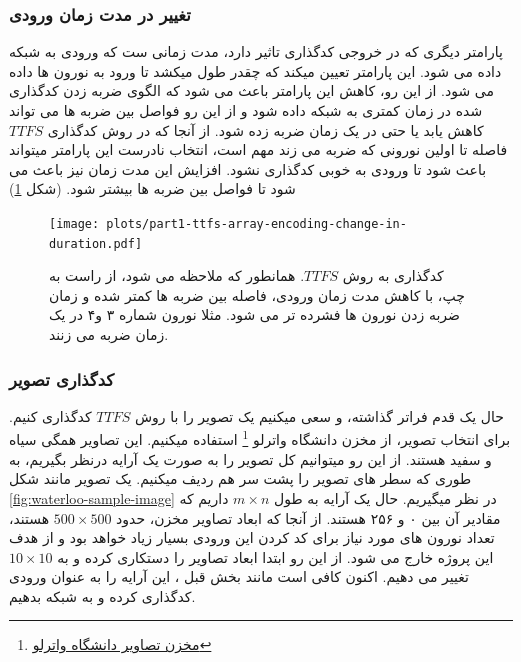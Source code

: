         \subsubsection*{تغییر در مدت زمان ورودی}
            پارامتر دیگری که در خروجی کدگذاری تاثیر دارد، مدت زمانی ست که ورودی به شبکه داده می شود. این پارامتر تعیین میکند که چقدر طول میکشد تا ورود به نورون ها داده می شود. از این رو، کاهش این پارامتر باعث می شود که الگوی ضربه زدن کدگذاری شده در زمان کمتری به شبکه داده شود و از این رو فواصل بین ضربه ها می تواند کاهش یابد یا حتی در یک زمان ضربه زده شود. از آنجا که در روش کدگذاری 
            $TTFS$ 
            فاصله تا اولین نورونی که ضربه می زند مهم است، انتخاب نادرست این پارامتر میتواند باعث شود تا ورودی به خوبی کدگذاری نشود.
            افزایش این مدت زمان نیز باعث می شود تا فواصل بین ضربه ها بیشتر شود.
            (شکل \ref{fig:part1-ttfs-array-encoding-change-in-duration})

            \begin{figure}[!ht]
                \centering
                \texttt{[image: plots/part1-ttfs-array-encoding-change-in-duration.pdf]} 
                \caption{کدگذاری به روش 
                $TTFS$. همانطور که ملاحظه می شود، از راست به چپ، با کاهش مدت زمان ورودی، فاصله بین ضربه ها کمتر شده و زمان ضربه زدن نورون ها فشرده تر می شود. مثلا نورون شماره ۳ و۴ در یک زمان ضربه می زنند.}
                \label{fig:part1-ttfs-array-encoding-change-in-duration}
            \end{figure}
        
        \subsubsection*{کدگذاری تصویر}
            حال یک قدم فراتر گذاشته، و سعی میکنیم یک تصویر را با روش 
            $TTFS$ 
            کدگذاری کنیم. برای انتخاب تصویر، از مخزن دانشگاه واترلو
            \footnote{\href{https://links.uwaterloo.ca/Repository.html}{مخزن تصاویر دانشگاه واترلو}}
            استفاده میکنیم. این تصاویر همگی سیاه و سفید هستند. از این رو میتوانیم کل تصویر را به صورت یک آرایه درنظر بگیریم، به طوری که سطر های تصویر را پشت سر هم ردیف میکنیم. یک تصویر مانند شکل
            \ref{fig:waterloo-sample-image}
            در نظر میگیریم.
            حال یک آرایه به طول 
            $m\times n$ 
            داریم که مقادیر آن بین ۰ و ۲۵۶ هستند. از آنجا که ابعاد تصاویر مخزن، حدود 
            $500\times 500$ 
            هستند، تعداد نورون های مورد نیاز برای کد کردن این ورودی بسیار زیاد خواهد بود و از هدف این پروژه خارج می شود. از این رو ابتدا ابعاد تصاویر را دستکاری کرده و به 
            $10\times 10$ 
            تغییر می دهیم.
            اکنون کافی است مانند بخش قبل ، این آرایه را به عنوان ورودی کدگذاری کرده و به شبکه بدهیم.

